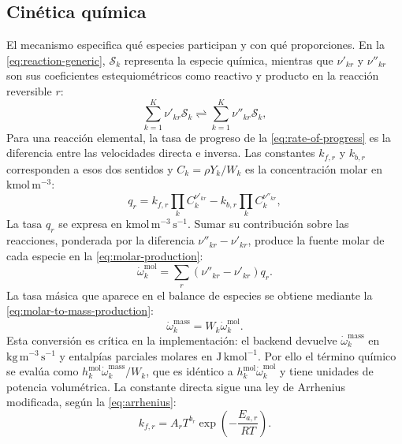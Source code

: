 \documentclass[12pt,a4paper,twoside,openany]{book}
\begin{document}
\subsection{Cinética química}

El mecanismo especifica qué especies participan y con qué proporciones.
En la \cref{eq:reaction-generic}, \(\mathcal S_k\) representa la especie
química, mientras que \(\nu'_{kr}\) y \(\nu''_{kr}\) son sus coeficientes
estequiométricos como reactivo y producto en la reacción reversible \(r\):
\begin{equation}
  \sum_{k=1}^{K}\nu'_{kr}\mathcal{S}_k
  \rightleftharpoons
  \sum_{k=1}^{K}\nu''_{kr}\mathcal{S}_k,
  \label{eq:reaction-generic}
\end{equation}
Para una reacción elemental, la tasa de progreso de la
\cref{eq:rate-of-progress} es la diferencia entre las velocidades directa e
inversa. Las constantes \(k_{f,r}\) y \(k_{b,r}\) corresponden a esos dos
sentidos y \(C_k=\rho Y_k/W_k\) es la concentración molar
en \(\mathrm{kmol\,m^{-3}}\):
\begin{equation}
  q_r=k_{f,r}\prod_k C_k^{\nu'_{kr}}
  -k_{b,r}\prod_k C_k^{\nu''_{kr}},
  \label{eq:rate-of-progress}
\end{equation}
La tasa \(q_r\) se expresa en \(\mathrm{kmol\,m^{-3}\,s^{-1}}\). Sumar
su contribución sobre las reacciones, ponderada por la diferencia
\(\nu''_{kr}-\nu'_{kr}\), produce la fuente molar de cada especie en la
\cref{eq:molar-production}:
\begin{equation}
  \dot\omega_k^{\mathrm{mol}}=
  \sum_r(\nu''_{kr}-\nu'_{kr})q_r.
  \label{eq:molar-production}
\end{equation}
La tasa másica que aparece en el balance de especies se obtiene mediante la \cref{eq:molar-to-mass-production}:
\begin{equation}
  \dot\omega_k^{\mathrm{mass}}=W_k\dot\omega_k^{\mathrm{mol}}.
  \label{eq:molar-to-mass-production}
\end{equation}
Esta conversión es crítica en la implementación: el backend devuelve
\(\dot\omega_k^{\mathrm{mass}}\) en \(\mathrm{kg\,m^{-3}\,s^{-1}}\) y entalpías
parciales molares en \(\mathrm{J\,kmol^{-1}}\). Por ello el término químico se
evalúa como
\(h_k^{\mathrm{mol}}\dot\omega_k^{\mathrm{mass}}/W_k\), que es idéntico a
\(h_k^{\mathrm{mol}}\dot\omega_k^{\mathrm{mol}}\) y tiene unidades de potencia
volumétrica. La constante directa sigue
una ley de Arrhenius modificada, según la \cref{eq:arrhenius}:
\begin{equation}
  k_{f,r}=A_rT^{b_r}\exp\left(-\frac{E_{a,r}}{RT}\right).
  \label{eq:arrhenius}
\end{equation}
\end{document}
